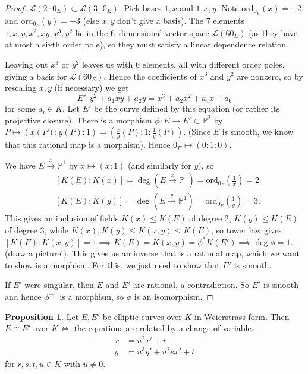 \documentclass{article}
\theoremstyle{definition}
\newtheorem{prop}[theorem]{Proposition}
\begin{document}
\begin{proof}
    $\mathcal{L}(2\cdot 0_E) \subset \mathcal{L}(3\cdot 0_E)$. Pick bases $1,x$ and $1,x,y$. Note $\text{ord}_{0_E}(x) = -2$ and $\text{ord}_{0_E}(y) = -3$ (else $x,y$ don't give a basis). The 7 elements $1,x,y,x^2,xy,x^3,y^2$ lie in the 6--dimensional vector space $\mathcal{L}(60_E)$ (as they have at most a sixth order pole), so they must satisfy a linear dependence relation. 

    \vspace{1mm}
     
    Leaving out $x^3$ or $y^2$ leaves us with 6 elements, all with different order poles, giving a basis for $\mathcal{L}(60_E)$. Hence the coefficients of $x^3$ and $y^2$ are nonzero, so by rescaling $x,y$ (if necessary) we get \[
    E': y^2 + a_1xy + a_2y = x^3 + a_2 x^2 + a_4 x + a_6
    \]
    for some $a_i \in K$. Let $E'$ be the curve defined by this equation (or rather its projective closure). There is a morphism $\phi: E \to E' \subset \mathbb{P}^2$ by $P \mapsto (x(P):y(P):1) = \left(\frac{x}{y}(P): 1: \frac{1}{y}(P)\right)$. (Since $E$ is smooth, we know that this rational map is a morphism). Hence $0_E \mapsto (0:1:0)$.
    \vspace{1mm}
     
    We have $E \stackrel{x}{\to} \mathbb{P}^1$ by $x \mapsto (x:1)$ (and similarly for $y$), so 
    \begin{align*}
        &[K(E):K(x)] = \deg(E \stackrel{x}{\to} \mathbb{P}^1) = \text{ord}_{0_E}\left(\frac{1}{x}\right) = 2\\
        &[K(E):K(y)] = \deg(E \stackrel{y}{\to} \mathbb{P}^1) = \text{ord}_{0_E}\left(\frac{1}{y}\right) = 3.
    \end{align*}
    This gives an inclusion of fields $K(x) \le K(E)$ of degree 2, $K(y) \le K(E)$ of degree 3, while $K(x), K(y) \le K(x,y) \le  K(E)$, so tower law gives $[K(E):K(x,y)] = 1 \implies K(E)=K(x,y)=\phi^* K(E') \implies \deg \phi = 1$. (draw a picture!). This gives us an inverse that is a rational map, which we want to show is a morphism. For this, we just need to show that $E'$ is smooth.
    \vspace{1mm}
     
    If $E'$ were singular, then $E$ and $E'$ are rational, a contradiction. So $E'$ is smooth and hence $\phi^{-1}$ is a morphism, so $\phi$ is an isomorphism.
\end{proof}
\begin{prop}\label{prop3.2}
    Let $E,E'$ be elliptic curves over $K$ in Weierstrass form. Then $E \cong E'$ over $K \iff$ the equations are related by a change of variables 
    \begin{align*}
    x &= u^2x' + r \\
    y &= u^3y' + u^2sx' + t
    \end{align*}
    for $r,s,t,u \in K$ with $u \neq 0$. 
\end{prop}
\end{document}
